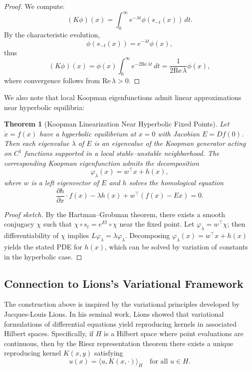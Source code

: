 \documentclass[11pt]{article}
\theoremstyle{plain}
\newtheorem{theorem}{Theorem}[section]
\def\[{\begin{equation}}
\def\]{\end{equation}}
\begin{document}
\begin{proof}
We compute:
\[
(K\phi)(x) = \int_0^\infty e^{-\lambda t} \phi(s_{-t}(x))\,dt.
\]
By the characteristic evolution,
\[
\phi(s_{-t}(x)) = e^{-\lambda t} \phi(x),
\]
thus
\[
(K\phi)(x) = \phi(x) \int_0^\infty e^{-2\mathrm{Re}\,\lambda t}\,dt = \frac{1}{2\mathrm{Re}\,\lambda}\phi(x),
\]
where convergence follows from $\mathrm{Re}\,\lambda>0$. 
\end{proof}

 
We also note that local Koopman eigenfunctions admit linear approximations near hyperbolic equilibria:

\begin{theorem}[Koopman Linearization Near Hyperbolic Fixed Points]
\label{thm:KoopmanLinear}
Let \(\dot{x} = f(x)\) have a hyperbolic equilibrium at \(x = 0\) with Jacobian \(E = Df(0)\). Then each eigenvalue \(\lambda\) of \(E\) is an eigenvalue of the Koopman generator acting on \(C^1\) functions supported in a local stable–unstable neighborhood. The corresponding Koopman eigenfunction admits the decomposition
\[
\varphi_\lambda(x) = w^\top x + h(x),
\]
where \(w\) is a left eigenvector of \(E\) and \(h\) solves the homological equation
\[
\frac{\partial h}{\partial x} \cdot f(x) - \lambda h(x) + w^\top (f(x) - Ex) = 0.
\]
\end{theorem}

\begin{proof}[Proof sketch]
By the Hartman–Grobman theorem, there exists a smooth conjugacy \(\chi\) such that \(\chi \circ s_t = e^{Et} \circ \chi\) near the fixed point. Let \(\varphi_\lambda = w^\top \chi\); then differentiability of \(\chi\) implies \(L \varphi_\lambda = \lambda \varphi_\lambda\). Decomposing \(\varphi_\lambda(x) = w^\top x + h(x)\) yields the stated PDE for \(h(x)\), which can be solved by variation of constants in the hyperbolic case.
\end{proof}
\subsection{Connection to Lions’s Variational Framework}

The construction above is inspired by the variational principles developed by Jacques-Louis Lions. In his seminal work, Lions showed that variational formulations of differential equations yield reproducing kernels in associated Hilbert spaces. Specifically, if \(H\) is a Hilbert space where point evaluations are continuous, then by the Riesz representation theorem there exists a unique reproducing kernel \(K(x,y)\) satisfying
\[
u(x) = \langle u, K(x,\cdot) \rangle_H \quad \text{for all } u\in H.
\]
\end{document}
